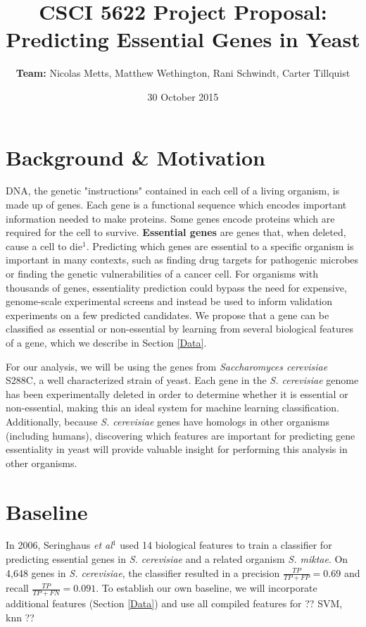 \documentclass{article}
\title{CSCI 5622 Project Proposal: Predicting Essential Genes in Yeast}
\author{\textbf{Team:} Nicolas Metts, Matthew Wethington, Rani Schwindt, Carter Tillquist}
\date{30 October 2015}
\begin{document}
\maketitle

\section{Background \& Motivation}
DNA, the genetic "instructions" contained in each cell of a living organism, is made up of genes. Each gene is a functional sequence which encodes important information needed to make proteins. Some genes encode proteins which are required for the cell to survive. \textbf{Essential genes} are genes that, when deleted, cause a cell to die$^1$. Predicting which genes are essential to a specific organism is important in many contexts, such as finding drug targets for pathogenic microbes or finding the genetic vulnerabilities of a cancer cell. For organisms with thousands of genes, essentiality prediction could bypass the need for expensive, genome-scale experimental screens and instead be used to inform validation experiments on a few predicted candidates. We propose that a gene can be classified as essential or non-essential by learning from several biological features of a gene, which we describe in Section \ref{Data}. 

\vspace{3mm}

\noindent
For our analysis, we will be using the genes from \textit{Saccharomyces cerevisiae} S288C, a well characterized strain of yeast. Each gene in the \textit{S. cerevisiae} genome has been experimentally deleted in order to determine whether it is essential or non-essential, making this an ideal system for machine learning classification. Additionally, because \textit{S. cerevisiae} genes have homologs in other organisms (including humans), discovering which features are important for predicting gene essentiality in yeast will provide valuable insight for performing this analysis in other organisms.

\section{Baseline}

In 2006, Seringhaus \textit{et al}$^1$ used 14 biological features to train a classifier for predicting essential genes in \textit{S. cerevisiae} and a related organism \textit{S. miktae}. On 4,648 genes in \textit{S. cerevisiae}, the classifier resulted in a precision $\frac{TP}{TP+FP} = 0.69$ and recall $\frac{TP}{TP+FN} = 0.091$. To establish our own baseline, we will incorporate additional features (Section \ref{Data}) and use all compiled features for ?? SVM, knn ??
\end{document}
